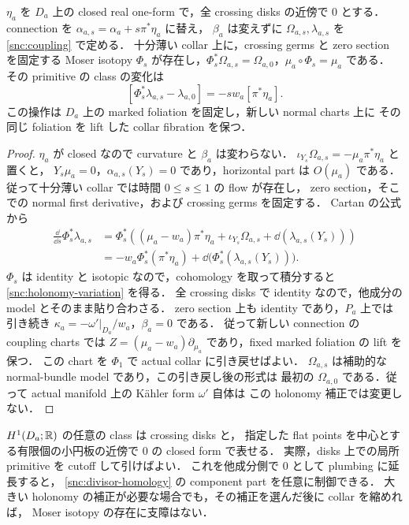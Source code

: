\begin{lemma}
\label{snc:holonomy}
$\eta_a$ を $D_a$ 上の closed real one-form で，全 crossing disks の近傍で $0$ とする．
connection を $\alpha_{a,s}=\alpha_a+s\pi^*\eta_a$ に替え，
$\beta_a$ は変えずに $\Omega_{a,s},\lambda_{a,s}$ を \eqref{snc:coupling} で定める．
十分薄い collar 上に，crossing germs と zero section を固定する Moser isotopy
$\Phi_s$ が存在し，$\Phi_s^*\Omega_{a,s}=\Omega_{a,0}$，$\mu_a\circ\Phi_s=\mu_a$ である．
その primitive の class の変化は
\begin{equation}\label{snc:holonomy-variation}
 [\Phi_s^*\lambda_{a,s}-\lambda_{a,0}]
     =-s w_a[\pi^*\eta_a].
\end{equation}
この操作は $D_a$ 上の marked foliation を固定し，新しい normal charts 上に
その同じ foliation を lift した collar fibration を保つ．
\end{lemma}
\begin{proof}
$\eta_a$ が closed なので curvature と $\beta_a$ は変わらない．
$\iota_{Y_s}\Omega_{a,s}=-\mu_a\pi^*\eta_a$ と置くと，
$Y_s\mu_a=0$，$\alpha_{a,s}(Y_s)=0$ であり，horizontal part は $O(\mu_a)$ である．
従って十分薄い collar では時間 $0\leq s\leq1$ の flow が存在し，
zero section，そこでの normal first derivative，および crossing germs を固定する．
Cartan の公式から
\begin{align*}
 \frac{\dd}{\dd s}\Phi_s^*\lambda_{a,s}
 &=\Phi_s^*\left((\mu_a-w_a)\pi^*\eta_a
                +\iota_{Y_s}\Omega_{a,s}
                +\dd(\lambda_{a,s}(Y_s))\right)\\
 &=-w_a\Phi_s^*(\pi^*\eta_a)
      +\dd\bigl(\Phi_s^*(\lambda_{a,s}(Y_s))\bigr).
\end{align*}
$\Phi_s$ は identity と isotopic なので，cohomology を取って積分すると
\eqref{snc:holonomy-variation} を得る．
全 crossing disks で identity なので，他成分の model とそのまま貼り合わさる．
zero section 上も identity であり，$P_a$ 上では引き続き
$\kappa_a=-\omega'|_{D_a}/w_a$，$\beta_a=0$ である．
従って新しい connection の coupling charts では
$Z=(\mu_a-w_a)\partial_{\mu_a}$ であり，fixed marked foliation の lift を保つ．
この chart を $\Phi_1$ で actual collar に引き戻せばよい．
$\Omega_{a,s}$ は補助的な normal-bundle model であり，この引き戻し後の形式は
最初の $\Omega_{a,0}$ である．従って actual manifold 上の Kähler form $\omega'$ 自体は
この holonomy 補正では変更しない．
\end{proof}

$H^1(D_a;\mathbb R)$ の任意の class は crossing disks と，
指定した flat points を中心とする有限個の小円板の近傍で $0$ の closed form で表せる．
実際，disks 上での局所 primitive を cutoff して引けばよい．
これを他成分側で $0$ として plumbing に延長すると，
\eqref{snc:divisor-homology} の component part を任意に制御できる．
大きい holonomy の補正が必要な場合でも，その補正を選んだ後に collar を縮めれば，
Moser isotopy の存在に支障はない．

